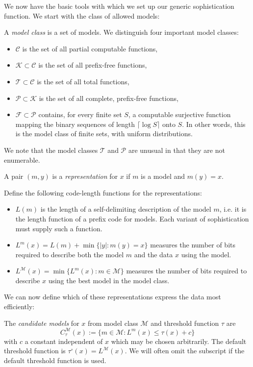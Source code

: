 \documentclass{style/llncs}
\newcommand{\M}{\mathscr M}
\newcommand{\C}{\mathscr C}
\newcommand{\T}{\mathscr T}
\newcommand{\F}{\mathscr F}
\renewcommand{\P}{\mathscr P}
\newcommand{\K}{\mathscr K}
\begin{document}
We now have the basic tools with which we set up our generic sophistication function. We start with the class of allowed models:

\begin{definition} A \emph{model class} is a set of models. We distinguish four important model classes:
  \begin{itemize}
  \item $\C$ is the set of all partial computable functions,
  \item $\K\subset\C$ is the set of all prefix-free
    functions,
  \item $\T\subset\C$ is the set of all total functions,
  \item $\P\subset\K$ is the set of all complete, prefix-free functions,
  \item $\F\subset\P$ contains, for every finite set $S$, a computable
    surjective function mapping the binary sequences of length
    $\lceil\log S\rceil$ onto $S$. In other words, this is the model class of finite sets, with uniform distributions.
  \end{itemize}
\end{definition}

We note that the model classes $\T$ and $\P$ are unusual in that they are not enumerable.

\begin{definition}
A pair $(m,y)$ is a \emph{representation} for $x$ if $m$ is a model and $m(y)=x$. 

Define the following code-length functions for the representations:
\begin{itemize}
\item $L(m)$ is the length of a self-delimiting description of
  the model $m$, i.e. it is the length function of a prefix code for models. Each variant of sophistication must supply such a function.
\item $L^m(x)=L(m)+\min\{|y|:m(y)=x\}$ measures the number of bits required to describe both the model $m$ and the data $x$ using the model.
\item $L^\M(x)=\min\{L^m(x):m\in\M\}$ measures the number of bits
  required to describe $x$ using the best model in the model class.
\end{itemize}
\end{definition}
We can now define which of these representations express the data most efficiently:
\begin{definition}
The \emph{candidate models} for $x$ from model class $\M$ and threshold function $\tau$ are
\[
  C^\M_\tau(x):=\{m\in\M:L^m(x)\le \tau(x) + c\}
\]
with $c$ a constant independent of $x$ which may be chosen arbitrarily. The default threshold function is $\tau^\circ(x)=L^\M(x)$. We will often omit the subscript if the default threshold function is used. 
\end{definition}
\end{document}
